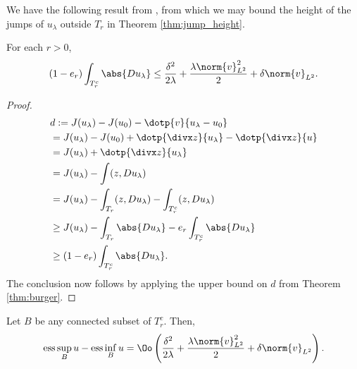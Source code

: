   
  We have the following result from \cite{burger2004convergence}, from which we may bound the height of the jumps of $u_\lambda$ outside $T_r$ in Theorem \ref{thm:jump_height}.



\begin{thm}\cite{burger2004convergence}\label{thm:burger_outside_tube}
For each $r>0$,
$$
(1-e_r)\int_{T_r^c} \abs{D u_\lambda}\leq  \frac{\delta^2}{2\lambda} +\frac{\lambda  \norm{v}_{L^2}^2}{2} + \delta \norm{v}_{L^2}.
$$
\end{thm}
\begin{proof}
\begin{align*}
&d:= J(u_\lambda) - J(u_0) - \dotp{v}{u_\lambda-u_0}\\
&= J(u_\lambda) - J(u_0) + \dotp{\divx z}{u_\lambda} -\dotp{\divx z }{u}\\
&= J(u_\lambda)  + \dotp{\divx z}{u_\lambda}\\
&= J(u_\lambda)  -\int ( z, D u_\lambda)\\
&= J(u_\lambda)  -\int_{T_r} ( z, D u_\lambda) -\int_{T_r^c} ( z, D u_\lambda)\\
&\geq J(u_\lambda)  -\int_{T_r}\abs{D u_\lambda} -e_r \int_{T_r^c} \abs{D u_\lambda}\\
&\geq (1-e_r) \int_{T_r^c} \abs{D u_\lambda}.
\end{align*}
The conclusion now follows by applying the upper bound on $d$ from Theorem \ref{thm:burger}.
\end{proof}



\begin{thm}\label{thm:jump_height}
Let $B$ be any connected subset of $T_r^c$. Then,
$$
\mathrm{ess}\sup_B u - \mathrm{ess}\inf_B u = \Oo \left(\frac{\delta^2}{2\lambda} +\frac{\lambda  \norm{v}_{L^2}^2}{2} + \delta \norm{v}_{L^2}\right).
$$
\end{thm}


